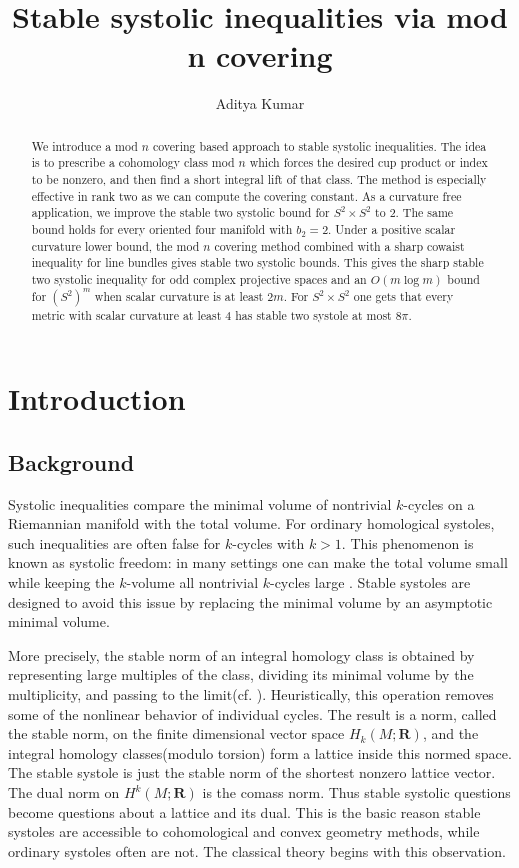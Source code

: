 \documentclass[11pt,reqno]{amsart}
\title{Stable systolic inequalities via mod n covering}
\author{Aditya Kumar}
\date{}
\numberwithin{equation}{section}
\numberwithin{equation}{section}
\theoremstyle{definition}
\newcommand{\R}{\mathbf R}
\begin{document}
\begin{abstract}
We introduce a mod $n$ covering based approach to stable systolic inequalities. The idea is to prescribe a cohomology class mod \(n\) which forces the desired cup product or index to be nonzero, and then find a short integral lift of that class. The method is especially effective in rank two as we can compute the covering constant. As a curvature free application, we improve the stable two systolic bound for \(S^2\times S^2\) to \(2\). The same bound holds for every oriented four manifold with \(b_2=2\). Under a positive scalar curvature lower bound, the mod \(n\) covering method combined with a sharp cowaist inequality for line bundles gives stable two systolic bounds. This gives the sharp stable two systolic inequality for odd complex projective spaces and an \(O(m\log m)\) bound for \((S^2)^m\) when scalar curvature is at least \(2m\). For \(S^2\times S^2\) one gets that every metric with scalar curvature at least \(4\) has stable two systole at most \(8\pi\).
\end{abstract}

\maketitle
\tableofcontents

\section{Introduction}

\subsection{Background} Systolic inequalities compare the minimal volume of nontrivial $k$-cycles on a Riemannian manifold with the total volume. For ordinary homological systoles, such inequalities are often false for \(k\)-cycles with \(k >1\). This phenomenon is known as systolic freedom: in many settings one can make the total volume small while keeping the $k$-volume all nontrivial $k$-cycles large \cite{gromov-systolic,babenko-katz,Katz-suciu,freedman}. Stable systoles are designed to avoid this issue by replacing the minimal volume by an asymptotic minimal volume.

More precisely, the stable norm of an integral homology class is obtained by representing large multiples of the class, dividing its minimal volume by the multiplicity, and passing to the limit(cf. \cite[section 5]{Federer}). Heuristically, this operation removes some of the nonlinear behavior of individual cycles. The result is a norm, called the stable norm, on the finite dimensional vector space \(H_k(M;\R)\), and the integral homology classes(modulo torsion) form a lattice inside this normed space. The stable systole is just the stable norm of the shortest nonzero lattice vector. The dual norm on \(H^k(M;\R)\) is the comass norm. Thus stable systolic questions become questions about a lattice and its dual. This is the basic reason stable systoles are accessible to cohomological and convex geometry methods, while ordinary systoles often are not. The classical theory begins with this observation. 
\end{document}

